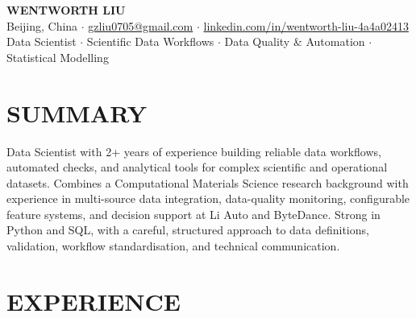 \documentclass[a4paper,10pt]{article}
\begin{document}
\begin{center}
    {\Large\bfseries WENTWORTH LIU}\\[2pt]
    {\small Beijing, China \;$\cdot$\; \href{mailto:gzliu0705@gmail.com}{gzliu0705@gmail.com} \;$\cdot$\; \href{https://www.linkedin.com/in/wentworth-liu-4a4a02413/}{linkedin.com/in/wentworth-liu-4a4a02413}}\\[2pt]
    {\small Data Scientist \;$\cdot$\; Scientific Data Workflows \;$\cdot$\; Data Quality \& Automation \;$\cdot$\; Statistical Modelling}
\end{center}

\vspace{-3pt}

\section{SUMMARY}
Data Scientist with 2+ years of experience building reliable data workflows, automated checks, and analytical tools for complex scientific and operational datasets. Combines a Computational Materials Science research background with experience in multi-source data integration, data-quality monitoring, configurable feature systems, and decision support at Li Auto and ByteDance. Strong in Python and SQL, with a careful, structured approach to data definitions, validation, workflow standardisation, and technical communication.

\section{EXPERIENCE}
\end{document}
